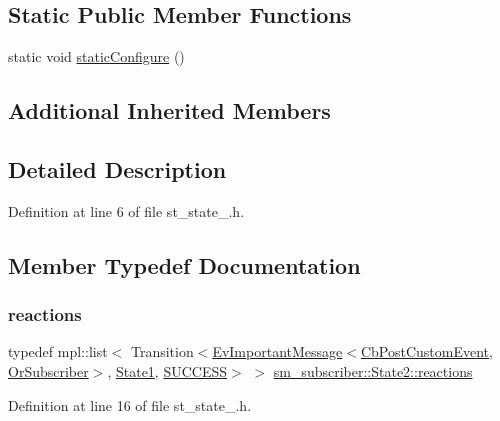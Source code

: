 \subsection*{Static Public Member Functions}
\begin{DoxyCompactItemize}
\item 
static void \hyperlink{structsm__subscriber_1_1State2_a4d2b2f5f8b2953a208ef2dda3e0eb666}{static\+Configure} ()
\end{DoxyCompactItemize}
\subsection*{Additional Inherited Members}


\subsection{Detailed Description}


Definition at line 6 of file st\+\_\+state\+\_.\+h.



\subsection{Member Typedef Documentation}
\mbox{\label{structsm__subscriber_1_1State2_abba890ef81d38401fdbbefb3df16d6c9}} 
\subsubsection{\texorpdfstring{reactions}{reactions}}
{\footnotesize\ttfamily typedef mpl\+::list$<$ Transition$<$\hyperlink{structsm__subscriber_1_1EvImportantMessage}{Ev\+Important\+Message}$<$\hyperlink{classsm__subscriber_1_1CbPostCustomEvent}{Cb\+Post\+Custom\+Event}, \hyperlink{classsm__subscriber_1_1OrSubscriber}{Or\+Subscriber}$>$, \hyperlink{structsm__subscriber_1_1State1}{State1}, \hyperlink{structsmacc_1_1default__transition__tags_1_1SUCCESS}{S\+U\+C\+C\+E\+SS}$>$ $>$ \hyperlink{structsm__subscriber_1_1State2_abba890ef81d38401fdbbefb3df16d6c9}{sm\+\_\+subscriber\+::\+State2\+::reactions}}



Definition at line 16 of file st\+\_\+state\+\_.\+h.



